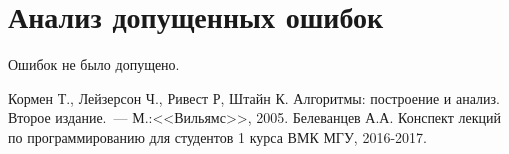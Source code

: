 \documentclass[a4paper,12pt,titlepage,finall]{article}
\begin{document}
\newpage

\section{Анализ допущенных ошибок}

Ошибок не было допущено.\\

\newpage
\begin{raggedright}
\begin{thebibliography}{99}
 Кормен Т., Лейзерсон Ч., Ривест Р, Штайн К. Алгоритмы: построение и анализ.
    Второе издание.~--- М.:<<Вильямс>>, 2005.
 Белеванцев А.А. Конспект лекций по программированию для студентов 1 курса ВМК МГУ, 2016-2017.
\end{thebibliography}
\end{raggedright}
\end{document}
